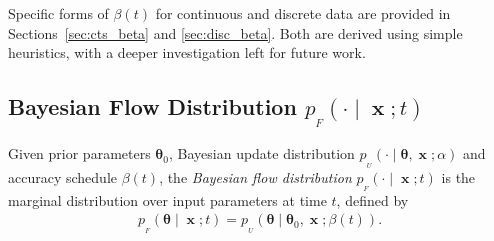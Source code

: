 \documentclass[11pt,table]{article}
\DeclareMathOperator{\x}{\mathbf{x}}
\newcommand{\tidx}[2]{#1_{#2}}
\renewcommand{\vec}[1]{\boldsymbol{#1}}
\newcommand{\pars}{\theta}
\newcommand{\parsn}{\vec{\pars}}
\newcommand{\parsnt}[1]{\tidx{\parsn}{#1}}
\newcommand{\0}[1]{\constvec{0}{#1}}
\newcommand{\1}[1]{\constvec{1}{#1}}
\newcommand{\flow}{p_{_F}}
\newcommand{\update}{p_{_U}}
\begin{document}
Specific forms of $\beta(t)$ for continuous and discrete data are provided in Sections~\ref{sec:cts_beta} and \ref{sec:disc_beta}. 
Both are derived using simple heuristics, with a deeper investigation left for future work.
\subsection{Bayesian Flow Distribution \texorpdfstring{$\flow(\cdot \mid \x ; t)$}{}}
Given prior parameters $\parsnt{0}$, Bayesian update distribution $\update(\cdot \mid \parsn, \x; \alpha)$ and accuracy schedule $\beta(t)$, the \emph{Bayesian flow distribution} $\flow(\cdot \mid \x ; t)$ is the marginal distribution over input parameters at time $t$, defined by
\begin{align}
\flow(\parsn \mid \x ; t) = \update(\parsn \mid \parsnt{0}, \x; \beta(t))\label{param_flow_dist}.
\end{align}
\end{document}
